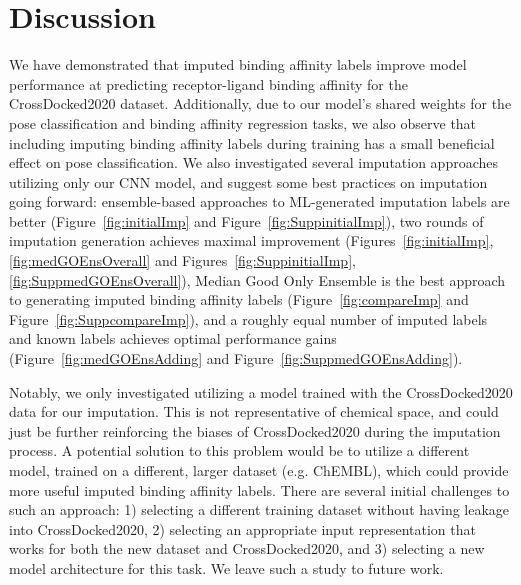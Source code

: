 \documentclass[journal=jcim,manuscript=article]{achemso}
\begin{document}
\section{Discussion}
We have demonstrated that imputed binding affinity labels improve model performance at predicting receptor-ligand binding affinity for the CrossDocked2020 dataset.
Additionally, due to our model's shared weights for the pose classification and binding affinity regression tasks, we also observe that including imputing binding affinity labels during training has a small beneficial effect on pose classification.
We also investigated several imputation approaches utilizing only our CNN model, and suggest some best practices on imputation going forward: ensemble-based approaches to ML-generated imputation labels are better (Figure~\ref{fig:initialImp} and Figure~\ref{fig:SuppinitialImp}), two rounds of imputation generation achieves maximal improvement (Figures~\ref{fig:initialImp},\ref{fig:medGOEnsOverall} and Figures~\ref{fig:SuppinitialImp},\ref{fig:SuppmedGOEnsOverall}), Median Good Only Ensemble is the best approach to generating imputed binding affinity labels (Figure~\ref{fig:compareImp} and Figure~\ref{fig:SuppcompareImp}), and a roughly equal number of imputed labels and known labels achieves optimal performance gains (Figure~\ref{fig:medGOEnsAdding} and Figure~\ref{fig:SuppmedGOEnsAdding}).

Notably, we only investigated utilizing a model trained with the CrossDocked2020 data for our imputation.
This is not representative of chemical space, and could just be further reinforcing the biases of CrossDocked2020 during the imputation process.
A potential solution to this problem would be to utilize a different model, trained on a different, larger dataset (e.g. ChEMBL\cite{Chembl}), which could provide more useful imputed binding affinity labels.
There are several initial challenges to such an approach: 1) selecting a different training dataset without having leakage into CrossDocked2020, 2) selecting an appropriate input representation that works for both the new dataset and CrossDocked2020, and 3) selecting a new model architecture for this task.
We leave such a study to future work.
\end{document}

